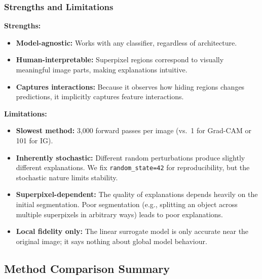 \documentclass[12pt, a4paper]{article}
\begin{document}
\subsubsection{Strengths and Limitations}

\textbf{Strengths:}
\begin{itemize}[leftmargin=*]
    \item \textbf{Model-agnostic:} Works with any classifier, regardless of
          architecture.
    \item \textbf{Human-interpretable:} Superpixel regions correspond to
          visually meaningful image parts, making explanations intuitive.
    \item \textbf{Captures interactions:} Because it observes how hiding
          regions changes predictions, it implicitly captures feature
          interactions.
\end{itemize}

\textbf{Limitations:}
\begin{itemize}[leftmargin=*]
    \item \textbf{Slowest method:} 3{,}000 forward passes per image (vs.\ 1
          for Grad-CAM or 101 for IG).
    \item \textbf{Inherently stochastic:} Different random perturbations
          produce slightly different explanations.  We fix
          \texttt{random\_state=42} for reproducibility, but the stochastic
          nature limits stability.
    \item \textbf{Superpixel-dependent:} The quality of explanations depends
          heavily on the initial segmentation.  Poor segmentation (e.g.,
          splitting an object across multiple superpixels in arbitrary ways)
          leads to poor explanations.
    \item \textbf{Local fidelity only:} The linear surrogate model is only
          accurate near the original image; it says nothing about global
          model behaviour.
\end{itemize}


\subsection{Method Comparison Summary}
\end{document}
